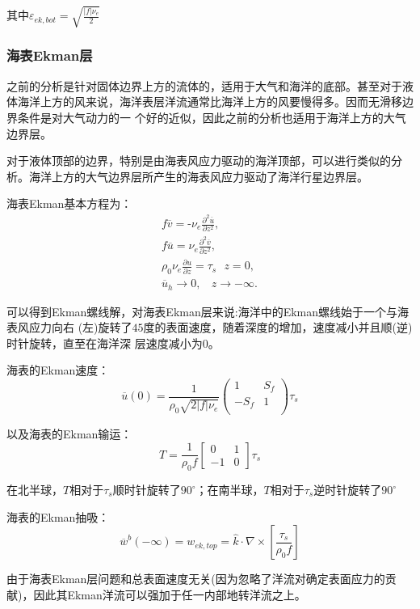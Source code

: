 \documentclass{article}
\begin{document}
其中${\varepsilon }_{ek,bot}=\sqrt{\frac{|f|\nu_e}{2}}$

\subsubsection{海表Ekman层}
之前的分析是针对固体边界上方的流体的，适用于大气和海洋的底部。甚至对于液体海洋上方的风来说，海洋表层洋流通常比海洋上方的风要慢得多。因而无滑移边界条件是对大气动力的一 个好的近似，因此之前的分析也适用于海洋上方的大气边界层。

对于液体顶部的边界，特别是由海表风应力驱动的海洋顶部，可以进行类似的分析。海洋上方的大气边界层所产生的海表风应力驱动了海洋行星边界层。

海表Ekman基本方程为：
\begin{align}
  & f\overline{v}=\text{-}{{\nu }_{e}}\frac{{{\partial }^{2}}\overline{u}}{\partial {{z}^{2}}}, \\ 
 & f\overline{u}={{\nu }_{e}}\frac{{{\partial }^{2}}\overline{v}}{\partial {{z}^{2}}}, \\ 
 & \rho_0\nu_e\frac{\partial u}{\partial z} = \tau_s\ \ \ z=0, \\ 
 & {{\overline{u}}_{h}}\to 0,\ \ \ \ z\to -\infty .\ \ \ \  
\end{align}

可以得到Ekman螺线解，对海表Ekman层来说:海洋中的Ekman螺线始于一个与海表风应力向右
(左)旋转了$45$度的表面速度，随着深度的增加，速度减小并且顺(逆)时针旋转，直至在海洋深
层速度减小为$0$。

海表的Ekman速度：
$$\overline{u}(0)=\frac{1}{{{\rho }_{0}}\sqrt{2\left| f \right|{{\nu }_{e}}}}\left( \begin{matrix}
   1 & {{S}_{f}}  \\
   -{{S}_{f}} & 1  \\
\end{matrix} \right){{\tau }_{s}}$$

以及海表的Ekman输运：
$$T=\frac{1}{\rho_0f}\begin{bmatrix}
    0& 1\\
    -1& 0
\end{bmatrix}\tau_s$$

在北半球，$T$相对于$\tau_s$顺时针旋转了$90^{\circ}$；在南半球，$T$相对于$\tau_s$逆时针旋转了$90^{\circ}$

海表的Ekman抽吸：
$${{\overline{w}}^{b}}(-\infty )={{w}_{ek,top}}=\hat{k}\cdot \nabla \times \left[ \frac{{{\tau }_{s}}}{{{\rho }_{0}}f} \right]$$

由于海表Ekman层问题和总表面速度无关(因为忽略了洋流对确定表面应力的贡献)，因此其Ekman洋流可以强加于任一内部地转洋流之上。
\end{document}

